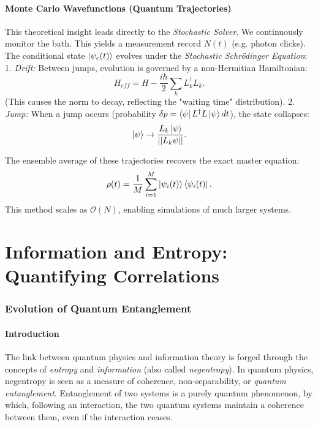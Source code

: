 \documentclass[11pt,a4paper]{article}
\theoremstyle{definition}
\begin{document}
\subsection{Monte Carlo Wavefunctions (Quantum Trajectories)}
This theoretical insight leads directly to the \emph{Stochastic Solver}.
We continuously monitor the bath. This yields a measurement record $N(t)$ (e.g. photon clicks).
The conditional state $\ket{\psi_c(t)}$ evolves under the \emph{Stochastic Schrödinger Equation}:
1.  \emph{Drift:} Between jumps, evolution is governed by a non-Hermitian Hamiltonian:
    \begin{equation}
        H_{eff} = H - \frac{i\hbar}{2}\sum_k L_k^\dagger L_k.
    \end{equation}
    (This causes the norm to decay, reflecting the "waiting time" distribution).
2.  \emph{Jump:} When a jump occurs (probability $\delta p = \bra{\psi}L^\dagger L \ket{\psi}dt$), the state collapses:
    \begin{equation}
        \ket{\psi} \to \frac{L_k \ket{\psi}}{||L_k \psi||}.
    \end{equation}

The ensemble average of these trajectories recovers the exact master equation:
\begin{equation}
    \rho(t) = \frac{1}{M} \sum_{i=1}^M \ket{\psi_i(t)}\bra{\psi_i(t)}.
\end{equation}
This method scales as $\mathcal{O}(N)$, enabling simulations of much larger systems.

\part{Information and Entropy: Quantifying Correlations}

\section{Evolution of Quantum Entanglement}
\label{sec:entanglement}

\subsection{Introduction}
The link between quantum physics and information theory is forged through the concepts of \emph{entropy} and \emph{information} (also called \emph{negentropy}). In quantum physics, negentropy is seen as a measure of coherence, non-separability, or \emph{quantum entanglement}.
Entanglement of two systems is a purely quantum phenomenon, by which, following an interaction, the two quantum systems maintain a coherence between them, even if the interaction ceases.
\end{document}
